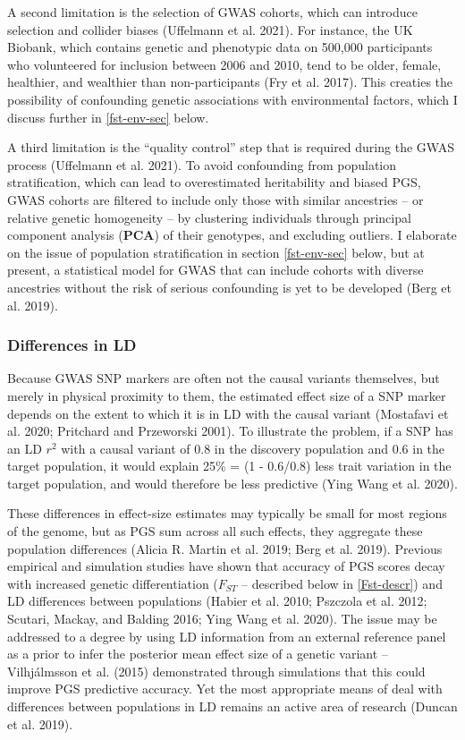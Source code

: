 \documentclass[
]{book}
\begin{document}
A second limitation is the selection of GWAS cohorts, which can introduce selection and collider biases (Uffelmann et al. 2021). For instance, the UK Biobank, which contains genetic and phenotypic data on 500,000 participants who volunteered for inclusion between 2006 and 2010, tend to be older, female, healthier, and wealthier than non-participants (Fry et al. 2017). This creaties the possibility of confounding genetic associations with environmental factors, which I discuss further in \ref{fst-env-sec} below.

A third limitation is the ``quality control'' step that is required during the GWAS process (Uffelmann et al. 2021). To avoid confounding from population stratification, which can lead to overestimated heritability and biased PGS, GWAS cohorts are filtered to include only those with similar ancestries -- or relative genetic homogeneity -- by clustering individuals through principal component analysis (\textbf{PCA}) of their genotypes, and excluding outliers. I elaborate on the issue of population stratification in section \ref{fst-env-sec} below, but at present, a statistical model for GWAS that can include cohorts with diverse ancestries without the risk of serious confounding is yet to be developed (Berg et al. 2019).

\hypertarget{differences-in-ld}{%
\subsubsection{Differences in LD}\label{differences-in-ld}}

Because GWAS SNP markers are often not the causal variants themselves, but merely in physical proximity to them, the estimated effect size of a SNP marker depends on the extent to which it is in LD with the causal variant (Mostafavi et al. 2020; Pritchard and Przeworski 2001). To illustrate the problem, if a SNP has an LD \(r^2\) with a causal variant of 0.8 in the discovery population and 0.6 in the target population, it would explain 25\% = (1 - 0.6/0.8) less trait variation in the target population, and would therefore be less predictive (Ying Wang et al. 2020).

These differences in effect-size estimates may typically be small for most regions of the genome, but as PGS sum across all such effects, they aggregate these population differences (Alicia R. Martin et al. 2019; Berg et al. 2019). Previous empirical and simulation studies have shown that accuracy of PGS scores decay with increased genetic differentiation (\(F_{ST}\) -- described below in \ref{Fst-descr}) and LD differences between populations (Habier et al. 2010; Pszczola et al. 2012; Scutari, Mackay, and Balding 2016; Ying Wang et al. 2020). The issue may be addressed to a degree by using LD information from an external reference panel as a prior to infer the posterior mean effect size of a genetic variant -- Vilhjálmsson et al. (2015) demonstrated through simulations that this could improve PGS predictive accuracy. Yet the most appropriate means of deal with differences between populations in LD remains an active area of research (Duncan et al. 2019).
\end{document}
